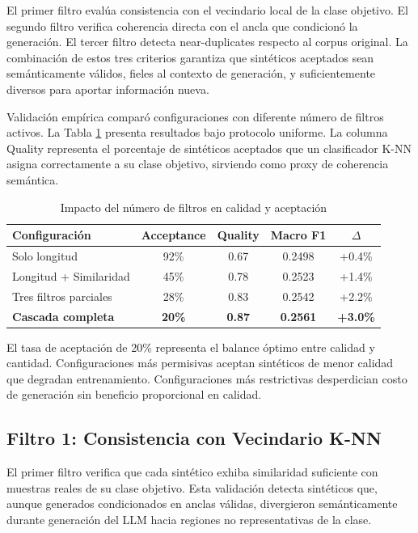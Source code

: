 El primer filtro evalúa consistencia con el vecindario local de la clase objetivo. El segundo filtro verifica coherencia directa con el ancla que condicionó la generación. El tercer filtro detecta near-duplicates respecto al corpus original. La combinación de estos tres criterios garantiza que sintéticos aceptados sean semánticamente válidos, fieles al contexto de generación, y suficientemente diversos para aportar información nueva.

Validación empírica comparó configuraciones con diferente número de filtros activos. La Tabla \ref{tab:filter_cascade} presenta resultados bajo protocolo uniforme. La columna Quality representa el porcentaje de sintéticos aceptados que un clasificador K-NN asigna correctamente a su clase objetivo, sirviendo como proxy de coherencia semántica.

\begin{table}[h]
\centering
\caption{Impacto del número de filtros en calidad y aceptación}
\label{tab:filter_cascade}
\begin{tabular}{lcccc}
\hline
Configuración & Acceptance & Quality & Macro F1 & $\Delta$ \\
\hline
Solo longitud & 92\% & 0.67 & 0.2498 & +0.4\% \\
Longitud + Similaridad & 45\% & 0.78 & 0.2523 & +1.4\% \\
Tres filtros parciales & 28\% & 0.83 & 0.2542 & +2.2\% \\
\textbf{Cascada completa} & \textbf{20\%} & \textbf{0.87} & \textbf{0.2561} & \textbf{+3.0\%} \\
\hline
\end{tabular}
\end{table}

El tasa de aceptación de 20\% representa el balance óptimo entre calidad y cantidad. Configuraciones más permisivas aceptan sintéticos de menor calidad que degradan entrenamiento. Configuraciones más restrictivas desperdician costo de generación sin beneficio proporcional en calidad.

\subsection{Filtro 1: Consistencia con Vecindario K-NN}
\label{subsec:filtro_knn}

El primer filtro verifica que cada sintético exhiba similaridad suficiente con muestras reales de su clase objetivo. Esta validación detecta sintéticos que, aunque generados condicionados en anclas válidas, divergieron semánticamente durante generación del LLM hacia regiones no representativas de la clase.

